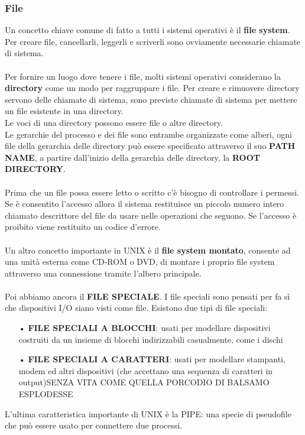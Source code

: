 \documentclass{article}
\begin{document}
\subsubsection{File}
Un concetto chiave comune di fatto a tutti i sistemi operativi è il \textbf{file system}. \\
Per creare file, cancellarli, leggerli e scriverli sono ovviamente necessarie chiamate di sistema. \\\\
Per fornire un luogo dove tenere i file, molti sistemi operativi considerano la \textbf{directory} come un modo per raggruppare i file. Per creare e rimuovere directory servono delle chiamate di sistema, sono previste chiamate di sistema per mettere un file esistente in una directory.
\\Le voci di una directory possono essere file o altre directory.
\\Le gerarchie del processo e dei file sono entrambe organizzate come alberi, ogni file della gerarchia delle directory può essere specificato attraverso il suo \textbf{PATH NAME}, a partire dall’inizio della gerarchia delle directory, la \textbf{ROOT DIRECTORY}.
\\
\\Prima che un file possa essere letto o scritto c’è bisogno di controllare i permessi.
Se è consentito l’accesso allora il sistema restituisce un piccolo numero intero chiamato descrittore del file da usare nelle operazioni che seguono. Se l’accesso è proibito viene restituito un codice d’errore.
\\
\\
Un altro concetto importante in UNIX è il \textbf{file system montato}, consente ad una unità esterna come CD-ROM o DVD, di montare i proprio file system attraverso una connessione tramite l’albero principale.
\\
\\Poi abbiamo ancora il \textbf{FILE SPECIALE}. I file speciali sono pensati per fa sì che dispositivi I/O siano visti come file. Esistono due tipi di file speciali:
\begin{enumerate}
   \item[•] \textbf{FILE SPECIALI A BLOCCHI}: usati per modellare dispositivi costruiti da un insieme di blocchi indirizzabili casualmente, come i dischi
   \item[•] \textbf{FILE SPECIALI A CARATTERI}: usati per modellare stampanti, modem ed altri dispositivi (che accettano una sequenza di caratteri in output)SENZA VITA COME QUELLA PORCODIO DI BALSAMO ESPLODESSE
\end{enumerate}
L’ultima caratteristica importante di UNIX è la PIPE: una specie di pseudofile che può essere usato per connettere due processi.
\end{document}
